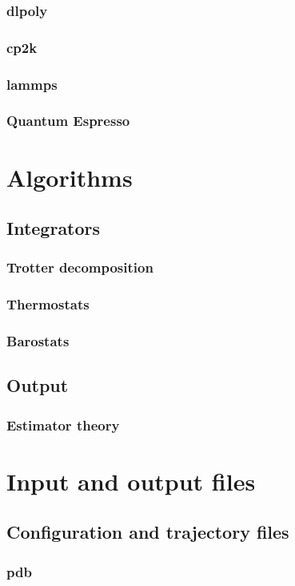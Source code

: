 \documentclass[12pt,fleqn]{report}
\begin{document}
\subsection{dlpoly}
\subsection{cp2k}
\subsection{lammps}
\subsection{Quantum Espresso}

\chapter{Algorithms}
\section{Integrators}
\subsection{Trotter decomposition}
\subsection{Thermostats}
\subsection{Barostats}
\section{Output}
\subsection{Estimator theory}

\chapter{Input and output files}
\section{Configuration and trajectory files}
\subsection{pdb}
\end{document}

